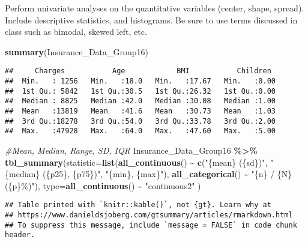 \documentclass[
]{article}
\newenvironment{Shaded}{\begin{snugshade}}{\end{snugshade}}
\newcommand{\AttributeTok}[1]{\textcolor[rgb]{0.13,0.29,0.53}{#1}}
\newcommand{\CommentTok}[1]{\textcolor[rgb]{0.56,0.35,0.01}{\textit{#1}}}
\newcommand{\FunctionTok}[1]{\textcolor[rgb]{0.13,0.29,0.53}{\textbf{#1}}}
\newcommand{\NormalTok}[1]{#1}
\newcommand{\SpecialCharTok}[1]{\textcolor[rgb]{0.81,0.36,0.00}{\textbf{#1}}}
\newcommand{\StringTok}[1]{\textcolor[rgb]{0.31,0.60,0.02}{#1}}
\begin{document}
Perform univariate analyses on the quantitative variables (center,
shape, spread). Include descriptive statistics, and histograms. Be sure
to use terms discussed in class such as bimodal, skewed left, etc.

\begin{Shaded}
\begin{Highlighting}[]
\FunctionTok{summary}\NormalTok{(Insurance\_Data\_Group16)}
\end{Highlighting}
\end{Shaded}

\begin{verbatim}
##     Charges           Age            BMI           Children   
##  Min.   : 1256   Min.   :18.0   Min.   :17.67   Min.   :0.00  
##  1st Qu.: 5842   1st Qu.:30.5   1st Qu.:26.32   1st Qu.:0.00  
##  Median : 8825   Median :42.0   Median :30.08   Median :1.00  
##  Mean   :13819   Mean   :41.6   Mean   :30.73   Mean   :1.03  
##  3rd Qu.:18278   3rd Qu.:54.0   3rd Qu.:33.78   3rd Qu.:2.00  
##  Max.   :47928   Max.   :64.0   Max.   :47.60   Max.   :5.00
\end{verbatim}

\begin{Shaded}
\begin{Highlighting}[]
\CommentTok{\#Mean, Median, Range, SD, IQR}
\NormalTok{Insurance\_Data\_Group16 }\SpecialCharTok{\%\textgreater{}\%}
\FunctionTok{tbl\_summary}\NormalTok{(}\AttributeTok{statistic=}\FunctionTok{list}\NormalTok{(}\FunctionTok{all\_continuous}\NormalTok{() }\SpecialCharTok{\textasciitilde{}} \FunctionTok{c}\NormalTok{(}\StringTok{"\{mean\} (\{sd\})"}\NormalTok{,}
\StringTok{"\{median\} (\{p25\}, \{p75\})"}\NormalTok{,}
\StringTok{"\{min\}, \{max\}"}\NormalTok{),}
\FunctionTok{all\_categorical}\NormalTok{() }\SpecialCharTok{\textasciitilde{}} \StringTok{"\{n\} / \{N\} (\{p\}\%)"}\NormalTok{),}
\AttributeTok{type=}\FunctionTok{all\_continuous}\NormalTok{() }\SpecialCharTok{\textasciitilde{}} \StringTok{"continuous2"}
\NormalTok{)}
\end{Highlighting}
\end{Shaded}

\begin{verbatim}
## Table printed with `knitr::kable()`, not {gt}. Learn why at
## https://www.danieldsjoberg.com/gtsummary/articles/rmarkdown.html
## To suppress this message, include `message = FALSE` in code chunk header.
\end{verbatim}
\end{document}

